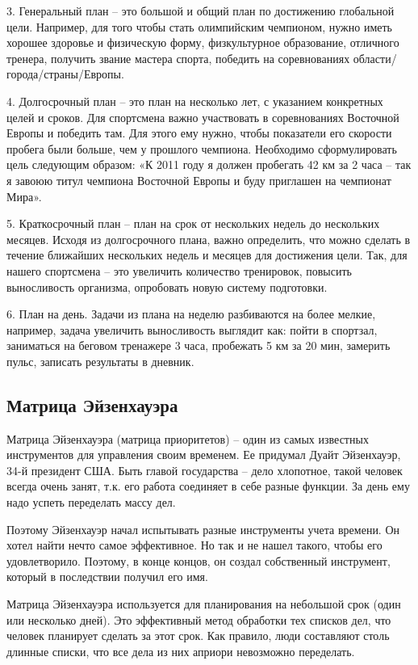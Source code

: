 3. Генеральный план – это большой и общий план по достижению глобальной цели. Например, для того чтобы стать олимпийским чемпионом, нужно иметь хорошее здоровье и физическую форму, физкультурное образование, отличного тренера, получить звание мастера спорта, победить на соревнованиях области/города/страны/Европы. 

4. Долгосрочный план – это план на несколько лет, с указанием конкретных целей и сроков. Для спортсмена важно участвовать в соревнованиях Восточной Европы и победить там. Для этого ему нужно, чтобы показатели его скорости пробега были больше, чем у прошлого чемпиона. Необходимо сформулировать цель следующим образом: «К 2011 году я должен пробегать 42 км за 2 часа – так я завоюю титул чемпиона Восточной Европы и буду приглашен на чемпионат Мира». 

5. Краткосрочный план – план на срок от нескольких недель до нескольких месяцев. Исходя из долгосрочного плана, важно определить, что можно сделать в течение ближайших нескольких недель и месяцев для достижения цели. Так, для нашего спортсмена – это увеличить количество тренировок, повысить выносливость организма, опробовать новую систему подготовки. 

6. План на день. Задачи из плана на неделю разбиваются на более мелкие, например, задача увеличить выносливость выглядит как: пойти в спортзал, заниматься на беговом тренажере 3 часа, пробежать 5 км за 20 мин, замерить пульс, записать результаты в дневник.

\subsection{Матрица Эйзенхауэра}
Матрица Эйзенхауэра (матрица приоритетов) – один из самых известных инструментов для управления своим временем. Ее придумал Дуайт Эйзенхауэр, 34-й президент США. Быть главой государства – дело хлопотное, такой человек всегда очень занят, т.к. его работа соединяет в себе разные функции. За день ему надо успеть переделать массу дел.

Поэтому Эйзенхауэр начал испытывать разные инструменты учета времени. Он хотел  найти нечто самое эффективное. Но так и не нашел такого, чтобы его удовлетворило. Поэтому, в конце концов, он создал собственный инструмент, который в последствии получил его имя.

Матрица Эйзенхауэра используется для планирования на небольшой срок (один или несколько дней). Это эффективный метод обработки тех списков дел, что человек планирует сделать за этот срок. Как правило, люди составляют столь длинные списки, что все дела из них априори невозможно переделать.

